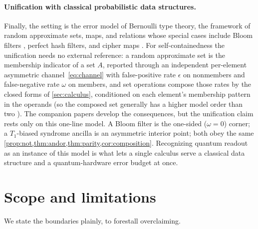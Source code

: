 \documentclass[11pt]{article}
\numberwithin{equation}{section}
\theoremstyle{plain}
\theoremstyle{definition}
\theoremstyle{remark}
\newcommand{\eps}{\epsilon}
\begin{document}
\paragraph{Unification with classical probabilistic data structures.}
Finally, the setting is the error model of Bernoulli
type theory, the framework of random approximate sets, maps, and relations whose
special cases include Bloom filters \citep{bloom1970}, perfect hash filters, and
cipher maps \citep{bernoulliSets,bernoulliComposition,bernoulliMaps,bernoulliRelations}.
For self-containedness the unification needs no external reference: a random
approximate set is the membership indicator of a set $A$, reported through an
independent per-element asymmetric channel~\eqref{eq:channel} with false-positive
rate $\eps$ on nonmembers and false-negative rate $\omega$ on members, and set
operations compose those rates by the closed forms of \cref{sec:calculus},
conditioned on each element's membership pattern in the operands (so the
composed set generally has a higher model order than two
\citep{bernoulliComposition}). The
companion papers develop the consequences, but the unification claim rests only on
this one-line model.
A Bloom filter is the one-sided ($\omega=0$) corner; a $T_1$-biased syndrome
ancilla is an asymmetric interior point; both obey the same
\cref{prop:not,thm:andor,thm:parity,cor:composition}. Recognizing quantum readout
as an instance of this model is what lets a single calculus serve a classical
data structure and a quantum-hardware error budget at once.


\section{Scope and limitations}
\label{sec:scope}

We state the boundaries plainly, to forestall overclaiming.
\end{document}

